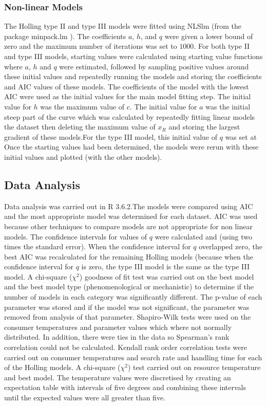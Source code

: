\documentclass{article}
\begin{document}
\subsubsection{Non-linear Models}
The Holling type II and type III models were fitted using NLSlm (from the package minpack.lm \cite{Elzhov2016}). The coefficients $a$, $h$, and $q$ were given a lower bound of zero and the maximum number of iterations was set to $1000$. For both type II and type III models, starting values were calculated using starting value functions where $a$, $h$ and $q$ were estimated, followed by sampling positive values around these initial values and repeatedly running the models and storing the coefficients and AIC values of these models. The coefficients of the model with the lowest AIC were used as the initial values for the main model fitting step. The initial value for $h$ was the maximum value of $c$. The initial value for $a$ was the initial steep part of the curve which was calculated by repeatedly fitting linear models the dataset then deleting the maximum value of $x_R$ and storing the largest gradient of these models.For the type III model, this initial value of $q$ was set at %
Once the starting values had been determined, the models were rerun with these initial values and plotted (with the other models). %
\subsection{Data Analysis}
Data analysis was carried out in R 3.6.2\cite{RCoreTeam2017}.The models were compared using AIC and the most appropriate model was determined for each dataset. AIC was used because other techniques to compare models are not appropriate for non linear models.  %
The confidence intervals for values of $q$ were calculated and (using two times the standard error). When the confidence interval for $q$ overlapped zero, the best AIC was recalculated for the remaining Holling models (because when the confidence interval for $q$ is zero, the type III model is the same as the type III model.  %
A chi-square ($\chi^2$) goodness of fit test was carried out on the best model and the best model type (phenomenological or mechanistic) to determine if the number of models in each category was significantly different.
The p-value of each parameter was stored and if the model was not significant, the parameter was removed from analysis of that parameter. Shapiro-Wilk tests were used on the consumer temperatures and parameter values which where not normally distributed. In addition, there were ties in the data so Spearman's rank correlation could not be calculated.  Kendall rank order correlation tests were carried out on consumer temperatures and search rate and handling time for each of the Holling models. A chi-square ($\chi^2$) test carried out on resource temperature and best model. The temperature values were discretised by creating an expectation table with intervals of five degrees and combining these intervals until the expected values were all greater than five.
\end{document}
